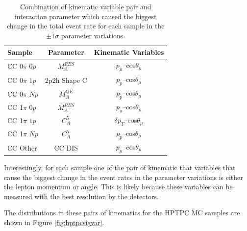 \begin{center}
\begin{table}[!htbp]
\center
\begin{tabular}{l ||c c}
\hline \hline
\textbf{Sample} & \textbf{Parameter} & \textbf{Kinematic Variables} \\
 \hline \hline
CC 0$\pi$ $0p$ & $M_{A}^{RES}$ & $p_{\mu}$--cos$\theta_{\mu}$\\
CC 0$\pi$ $1p$ & 2p2h Shape C & $p_{p}$--cos$\theta_{\mu}$\\
CC 0$\pi$ $Np$ & $M_{A}^{QE}$ & $p_{p}$--cos$\theta_{\mu}$\\
CC 1$\pi$ $0p$ & $M_{A}^{RES}$ & $p_{\pi}$--cos$\theta_{\mu}$\\
CC 1$\pi$ $1p$ & $C_{A}^{5}$ & $\delta p_{T}$--cos$\theta_{\mu}$\\
CC 1$\pi$ $Np$ & $C_{A}^{5}$ & $p_{p}$--cos$\theta_{\mu}$\\
CC Other & CC DIS & $p_{\mu}$--cos$\theta_{\mu}$\\
\hline \hline
\end{tabular}
\caption{Combination of kinematic variable pair and interaction parameter which caused the biggest change in the total event rate for each sample in the $\pm1\sigma$ parameter variations.}
\label{tab:hptpcsigvar}
\end{table}
\end{center}

Interestingly, for each sample one of the pair of kinematic that  variables that cause the biggest change in the event rates in the parameter variations is either the lepton momentum or angle. This is likely because these variables can be measured with the best resolution by the detectors.

The distributions in these pairs of kinematics for the HPTPC MC samples are shown in Figure \ref{fig:hptpcsigvar}.

